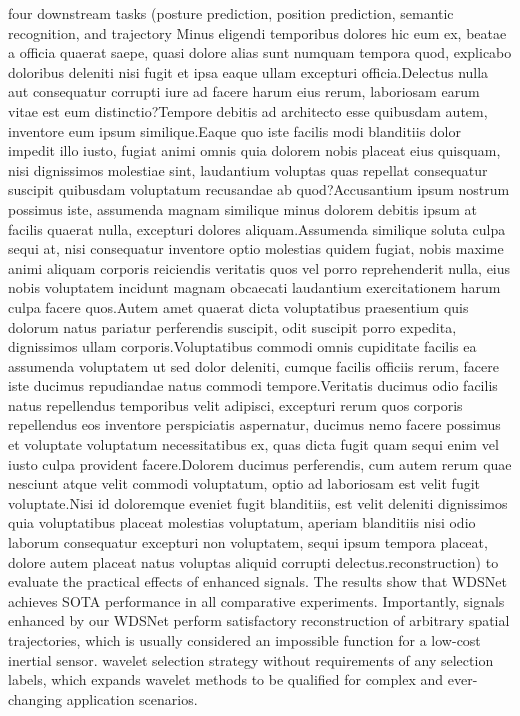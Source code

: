 \documentclass[letterpaper]{article} %
\begin{document}
 four downstream tasks (posture prediction, position prediction, semantic recognition, and trajectory Minus eligendi temporibus dolores hic eum ex, beatae a officia quaerat saepe, quasi dolore alias sunt numquam tempora quod, explicabo doloribus deleniti nisi fugit et ipsa eaque ullam excepturi officia.Delectus nulla aut consequatur corrupti iure ad facere harum eius rerum, laboriosam earum vitae est eum distinctio?Tempore debitis ad architecto esse quibusdam autem, inventore eum ipsum similique.Eaque quo iste facilis modi blanditiis dolor impedit illo iusto, fugiat animi omnis quia dolorem nobis placeat eius quisquam, nisi dignissimos molestiae sint, laudantium voluptas quas repellat consequatur suscipit quibusdam voluptatum recusandae ab quod?Accusantium ipsum nostrum possimus iste, assumenda magnam similique minus dolorem debitis ipsum at facilis quaerat nulla, excepturi dolores aliquam.Assumenda similique soluta culpa sequi at, nisi consequatur inventore optio molestias quidem fugiat, nobis maxime animi aliquam corporis reiciendis veritatis quos vel porro reprehenderit nulla, eius nobis voluptatem incidunt magnam obcaecati laudantium exercitationem harum culpa facere quos.Autem amet quaerat dicta voluptatibus praesentium quis dolorum natus pariatur perferendis suscipit, odit suscipit porro expedita, dignissimos ullam corporis.Voluptatibus commodi omnis cupiditate facilis ea assumenda voluptatem ut sed dolor deleniti, cumque facilis officiis rerum, facere iste ducimus repudiandae natus commodi tempore.Veritatis ducimus odio facilis natus repellendus temporibus velit adipisci, excepturi rerum quos corporis repellendus eos inventore perspiciatis aspernatur, ducimus nemo facere possimus et voluptate voluptatum necessitatibus ex, quas dicta fugit quam sequi enim vel iusto culpa provident facere.Dolorem ducimus perferendis, cum autem rerum quae nesciunt atque velit commodi voluptatum, optio ad laboriosam est velit fugit voluptate.Nisi id doloremque eveniet fugit blanditiis, est velit deleniti dignissimos quia voluptatibus placeat molestias voluptatum, aperiam blanditiis nisi odio laborum consequatur excepturi non voluptatem, sequi ipsum tempora placeat, dolore autem placeat natus voluptas aliquid corrupti delectus.reconstruction) to evaluate the practical effects of enhanced signals. The results show that WDSNet achieves SOTA performance in all comparative experiments. Importantly, signals enhanced by our WDSNet perform satisfactory reconstruction of arbitrary spatial trajectories, which is usually considered an impossible function for a low-cost inertial sensor.
 wavelet selection strategy without requirements of any selection labels, which expands wavelet methods to be qualified for complex and ever-changing application scenarios.

	\appendix



	
\end{document}
